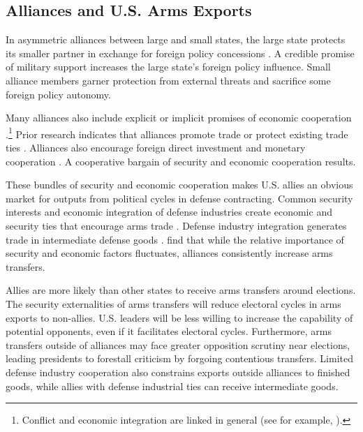\documentclass[12pt]{article}
\begin{document}
\subsection{Alliances and U.S. Arms Exports}


In asymmetric alliances between large and small states, the large state protects its smaller partner in exchange for foreign policy concessions \citep{Morrow1991}.
A credible promise of military support increases the large state's foreign policy influence. 
Small alliance members garner protection from external threats and sacrifice some foreign policy autonomy. 


Many alliances also include explicit or implicit promises of economic cooperation \citep{GowaMansfield2004, LongLeeds2006, Davis2008, Poast2012}.\footnote{Conflict and economic integration are linked in general (see for example, \citep{GartzkeLi2003, Chen2021}).}
Prior research indicates that alliances promote trade \citep{Gowa1995, GowaMansfield2004, Haim2016} or protect existing trade ties \citep{Fordham2010}.
Alliances also encourage foreign direct investment \citep{LiVashchilko2010} and monetary cooperation \citep{Li2003}.
A cooperative bargain of security and economic cooperation results. 


These bundles of security and economic cooperation makes U.S. allies an obvious market for outputs from political cycles in defense contracting.
Common security interests and economic integration of defense industries create economic and security ties that encourage arms trade \citep{Bitzinger1994}. 
Defense industry integration generates trade in intermediate defense goods \citep{Brooks2005}. 
\citet{Thurneretal2019} find that while the relative importance of security and economic factors fluctuates, alliances consistently increase arms transfers.


Allies are more likely than other states to receive arms transfers around elections.
The security externalities of arms transfers will reduce electoral cycles in arms exports to non-allies. 
U.S. leaders will be less willing to increase the capability of potential opponents, even if it facilitates electoral cycles.
Furthermore, arms transfers outside of alliances may face greater opposition scrutiny near elections, leading presidents to forestall criticism by forgoing contentious transfers.
Limited defense industry cooperation also constrains exports outside alliances to finished goods, while allies with defense industrial ties can receive intermediate goods.
\end{document}
